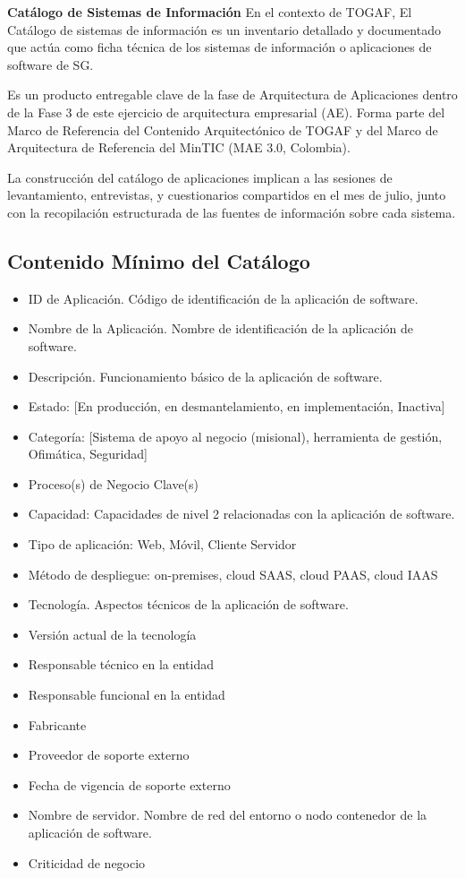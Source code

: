 \documentclass[
	a4paper, %
	12pt, %
]{include/CSSullivanBusinessReport}
\def\tightlist{}
\begin{document}
\textbf{Catálogo de Sistemas de Información} En el contexto de TOGAF, El
Catálogo de sistemas de información es un inventario detallado y
documentado que actúa como ficha técnica de los sistemas de información
o aplicaciones de software de SG.

Es un producto entregable clave de la fase de Arquitectura de
Aplicaciones dentro de la Fase 3 de este ejercicio de arquitectura
empresarial (AE). Forma parte del Marco de Referencia del Contenido
Arquitectónico de TOGAF y del Marco de Arquitectura de Referencia del
MinTIC (MAE 3.0, Colombia).

La construcción del catálogo de aplicaciones implican a las sesiones de
levantamiento, entrevistas, y cuestionarios compartidos en el mes de
julio, junto con la recopilación estructurada de las fuentes de
información sobre cada sistema.

\subsection{Contenido Mínimo del
Catálogo}\label{sec:contenido-muxednimo-del-catuxe1logo}

\begin{itemize}
\tightlist
\item
  ID de Aplicación. Código de identificación de la aplicación de
  software.
\item
  Nombre de la Aplicación. Nombre de identificación de la aplicación de
  software.
\item
  Descripción. Funcionamiento básico de la aplicación de software.
\item
  Estado: {[}En producción, en desmantelamiento, en implementación,
  Inactiva{]}
\item
  Categoría: {[}Sistema de apoyo al negocio (misional), herramienta de
  gestión, Ofimática, Seguridad{]}
\item
  Proceso(s) de Negocio Clave(s)
\item
  Capacidad: Capacidades de nivel 2 relacionadas con la aplicación de
  software.
\item
  Tipo de aplicación: Web, Móvil, Cliente Servidor
\item
  Método de despliegue: on-premises, cloud SAAS, cloud PAAS, cloud IAAS
\item
  Tecnología. Aspectos técnicos de la aplicación de software.
\item
  Versión actual de la tecnología
\item
  Responsable técnico en la entidad
\item
  Responsable funcional en la entidad
\item
  Fabricante
\item
  Proveedor de soporte externo
\item
  Fecha de vigencia de soporte externo
\item
  Nombre de servidor. Nombre de red del entorno o nodo contenedor de la
  aplicación de software.
\item
  Criticidad de negocio
\end{itemize}
\end{document}
